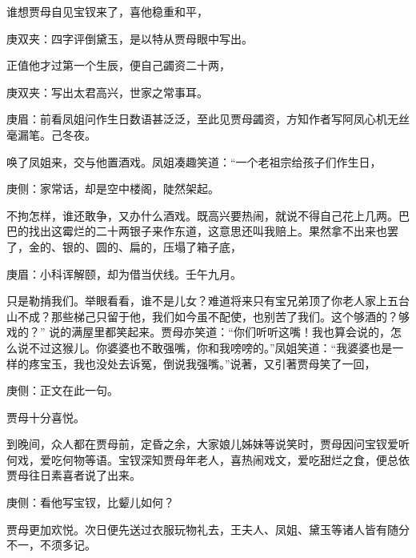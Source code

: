 \begin{parag}
    谁想贾母自见宝钗来了，喜他稳重和平，\begin{note}庚双夹：四字评倒黛玉，是以特从贾母眼中写出。\end{note}正值他才过第一个生辰，便自己蠲资二十两，\begin{note}庚双夹：写出太君高兴，世家之常事耳。\end{note}\begin{note}庚眉：前看凤姐问作生日数语甚泛泛，至此见贾母蠲资，方知作者写阿凤心机无丝毫漏笔。己冬夜。\end{note}唤了凤姐来，交与他置酒戏。凤姐凑趣笑道：“一个老祖宗给孩子们作生日，\begin{note}庚侧：家常话，却是空中楼阁，陡然架起。\end{note}不拘怎样，谁还敢争，又办什么酒戏。既高兴要热闹，就说不得自己花上几两。巴巴的找出这霉烂的二十两银子来作东道，这意思还叫我赔上。果然拿不出来也罢了，金的、银的、圆的、扁的，压塌了箱子底，\begin{note}庚眉：小科诨解颐，却为借当伏线。壬午九月。\end{note}只是勒掯我们。举眼看看，谁不是儿女？难道将来只有宝兄弟顶了你老人家上五台山不成？那些梯己只留于他，我们如今虽不配使，也别苦了我们。这个够酒的？够戏的？” 说的满屋里都笑起来。贾母亦笑道：“你们听听这嘴！我也算会说的，怎么说不过这猴儿。你婆婆也不敢强嘴，你和我嗙嗙的。”凤姐笑道：“我婆婆也是一样的疼宝玉，我也没处去诉冤，倒说我强嘴。”说著，又引著贾母笑了一回，\begin{note}庚侧：正文在此一句。\end{note}贾母十分喜悦。
\end{parag}


\begin{parag}
    到晚间，众人都在贾母前，定昏之余，大家娘儿姊妹等说笑时，贾母因问宝钗爱听何戏，爱吃何物等语。宝钗深知贾母年老人，喜热闹戏文，爱吃甜烂之食，便总依贾母往日素喜者说了出来。\begin{note}庚侧：看他写宝钗，比颦儿如何？\end{note}贾母更加欢悦。次日便先送过衣服玩物礼去，王夫人、凤姐、黛玉等诸人皆有随分不一，不须多记。
\end{parag}


